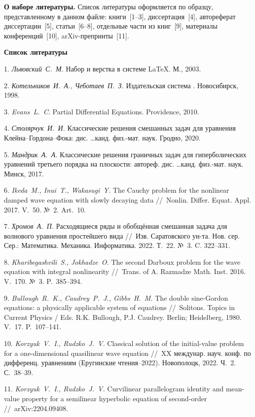 \documentclass[
	openany, %
	11pt, %
	a4paper, %
]{book} %
\begin{document}
\textbf{О наборе литературы.} Список литературы оформляется по образцу, представленному в данном файле: книги~[1--3], диссертация~[4], автореферат диссертации~[5], статьи~[6--8], отдельные части из книг~[9], материалы конференций~[10], arXiv-препринты~[11].

\begin{center}{\textbf{Список литературы}}\end{center}

\small{1. \textit{Львовский~С.~М.} Набор и верстка в системе \LaTeX. М., 2003.}

\small{2. \textit{Котельников~И.~А., Чеботаев~П.~З.} Издательская система \LaTeXe. Новосибирск, 1998.}

\small{3. \textit{Evans~L.~C.} Partial Differential Equations. Providence, 2010.}

\small{4. \textit{Столярчук~И.~И.} Классические решения смешанных задач для уравнения Клейна--Гордона--Фока: дис. \dots канд. физ.-мат. наук. Гродно, 2020.}

\small{5. \textit{Мандрик~А.~А.} Классические решения граничных задач для гиперболических уравнений третьего порядка на плоскости: автореф. дис. \dots канд. физ.-мат. наук. Минск, 2017.}

\small{6. \textit{Ikeda~M., Inui~T., Wakasugi~Y.} The Cauchy problem for the nonlinear damped wave equation with slowly
decaying data //~Nonlin. Differ. Equat. Appl. 2017. V.~50. №~2. Art.~10.}

\small{7. \textit{Хромов~А.~П.} Расходящиеся ряды и обобщённая смешанная задача для волнового уравнения простейшего вида //~Изв. Саратовского ун-та. Нов. сер. Сер.: Математика. Механика. Информатика. 2022. Т.~22. №~3. C. 322--331.}

\small{8. \textit{Kharibegashvili~S., Jokhadze~O.} The second Darboux problem for the wave equation with integral
nonlinearity //~Trans. of A. Razmadze Math. Inst. 2016. V.~170. №~3. P.~385--394.}

\small{9. \textit{Bullough~R.~K., Caudrey~P.~J., Gibbs~H.~M.} The double sine-Gordon equations: a physically applicable
system of equations //~Solitons. Topics in Current Physics / Eds. R.K. Bullough, P.J. Caudrey. Berlin; Heidelberg, 1980. V.~17. P.~107--141.}

\small{10. \textit{Korzyuk~V.~I., Rudzko~J.~V.} Classical solution of the initial-value problem for a one-dimensional quasilinear
wave equation //~XX междунар. науч. конф. по дифференц. уравнениям (Еругинские чтения--2022). Новополоцк, 2022. Ч.~2. С.~38--39.}

\small{11. \textit{Korzyuk~V.~I., Rudzko~J.~V.} Curvilinear parallelogram identity and mean-value property for a semilinear
hyperbolic equation of second-order //~arXiv:2204.09408.}
\end{document}
